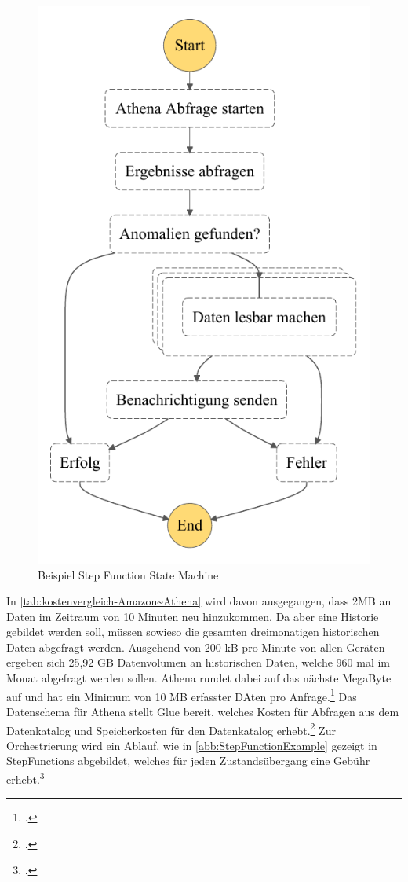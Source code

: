 \begin{figure}[H]
\centering
\includegraphics[height=0.45\textheight]{graphics/Step-Function-Athena.pdf}
\caption{Beispiel Step Function State Machine}
\label{abb:StepFunctionExample}
\end{figure}

In \autoref{tab:kostenvergleich-Amazon~Athena} wird davon ausgegangen, dass 2MB an Daten im Zeitraum von 10 Minuten neu hinzukommen. Da aber eine Historie gebildet werden soll, müssen sowieso die gesamten dreimonatigen historischen Daten abgefragt werden. Ausgehend von 200 kB pro Minute von allen Geräten ergeben sich 25,92 GB Datenvolumen an historischen Daten, welche 960 mal im Monat abgefragt werden sollen. Athena rundet dabei auf das nächste MegaByte auf und hat ein Minimum von 10 MB erfasster DAten pro Anfrage.\footcite[Vgl.][]{AmazonWebServicesInc..o.J.t} Das Datenschema für Athena stellt Glue bereit, welches Kosten für Abfragen aus dem Datenkatalog und Speicherkosten für den Datenkatalog erhebt.\footcite[Vgl.][]{AmazonWebServicesInc..o.J.u} Zur Orchestrierung wird ein Ablauf, wie in \autoref{abb:StepFunctionExample} gezeigt in StepFunctions abgebildet, welches für jeden Zustandsübergang eine Gebühr erhebt.\footcite[Vgl.][]{AmazonWebServicesInc..o.J.v}


